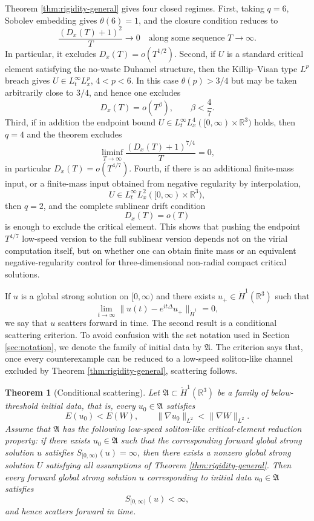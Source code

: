 \documentclass[10pt,a4paper]{amsart}
\numberwithin{equation}{section}
\newtheorem{theorem}{Theorem}[section]
\newcommand{\R}{\mathbb R}
\begin{document}
Theorem \ref{thm:rigidity-general} gives four closed regimes. First, taking $q=6$, Sobolev embedding gives $\theta(6)=1$, and the closure condition reduces to
\[
  \frac{(D_x(T)+1)^2}{T}\to0
  \quad\text{along some sequence }T\to\infty.
\]
In particular, it excludes $D_x(T)=o(T^{1/2})$. Second, if $U$ is a standard critical element satisfying the no-waste Duhamel structure, then the Killip--Visan type $L^p$ breach gives $U\in L_t^\infty L_x^p$, $4<p<6$. In this case $\theta(p)>3/4$ but may be taken arbitrarily close to $3/4$, and hence one excludes
\[
  D_x(T)=o(T^\beta),
  \qquad \beta<\frac47.
\]
Third, if in addition the endpoint bound $U\in L_t^\infty L_x^4([0,\infty)\times\R^3)$ holds, then $q=4$ and the theorem excludes
\begin{equation}\label{eq:L4-endpoint-sequence-intro}
  \liminf_{T\to\infty}\frac{(D_x(T)+1)^{7/4}}{T}=0,
\end{equation}
in particular $D_x(T)=o(T^{4/7})$. Fourth, if there is an additional finite-mass input, or a finite-mass input obtained from negative regularity by interpolation,
\[
  U\in L_t^\infty L_x^2([0,\infty)\times\R^3),
\]
then $q=2$, and the complete sublinear drift condition
\[
  D_x(T)=o(T)
\]
is enough to exclude the critical element. This shows that pushing the endpoint $T^{4/7}$ low-speed version to the full sublinear version depends not on the virial computation itself, but on whether one can obtain finite mass or an equivalent negative-regularity control for three-dimensional non-radial compact critical solutions.

If $u$ is a global strong solution on $[0,\infty)$ and there exists $u_+\in\dot H^1(\R^3)$ such that
\[
  \lim_{t\to\infty}\|u(t)-e^{it\Delta}u_+\|_{\dot H^1}=0,
\]
we say that $u$ scatters forward in time. The second result is a conditional scattering criterion. To avoid confusion with the set notation used in Section \ref{sec:notation}, we denote the family of initial data by $\mathfrak A$. The criterion says that, once every counterexample can be reduced to a low-speed soliton-like channel excluded by Theorem \ref{thm:rigidity-general}, scattering follows.

\begin{theorem}[Conditional scattering]\label{thm:scattering-conditional}
Let $\mathfrak A\subset\dot H^1(\R^3)$ be a family of below-threshold initial data, that is, every $u_0\in\mathfrak A$ satisfies
\[
  E(u_0)<E(W),
  \qquad \|\nabla u_0\|_{L^2}<\|\nabla W\|_{L^2}.
\]
Assume that $\mathfrak A$ has the following low-speed soliton-like critical-element reduction property: if there exists $u_0\in\mathfrak A$ such that the corresponding forward global strong solution $u$ satisfies $S_{[0,\infty)}(u)=\infty$, then there exists a nonzero global strong solution $U$ satisfying all assumptions of Theorem \ref{thm:rigidity-general}. Then every forward global strong solution $u$ corresponding to initial data $u_0\in\mathfrak A$ satisfies
\[
  S_{[0,\infty)}(u)<\infty,
\]
and hence scatters forward in time.
\end{theorem}
\end{document}
